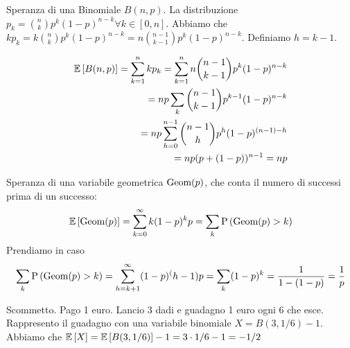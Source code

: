 \begin{defn}
    Speranza di una Binomiale $ B(n,p) $. La distribuzione $ p_k = \binom{n}{k}p^k(1-p)^{n-k}  \forall k \in [0,n] $. Abbiamo che $ kp_k = k \binom{n}{k}p^k (1-p)^{n-k} = n \binom{n-1}{k-1} p^k(1-p)^{n-k} $. Definiamo $ h = k-1 $.
    
    \begin{equation*}
        \begin{aligned}
            \mathbb{E}\left[B(n,p)\right] = \sum_{k=1}^{n} kp_k = \sum_{k=1}^{n} n \binom{n-1}{k-1} p^k(1-p)^{n-k} \\
            = np \sum_{k} \binom{n-1}{k-1}p^{k-1}(1-p)^{n-k} \\
            = np \sum_{h=0}^{n-1} \binom{n-1}{h} p^h(1-p)^{(n-1) - h } \\
            = np(p+(1-p))^{n-1} = np
        \end{aligned}
    \end{equation*}

\end{defn}

\begin{defn}
    Speranza di una variabile geometrica $ \text{Geom}(p) $, che conta il numero di successi prima di un successo:
    \begin{equation*}
    \mathbb{E}\left[\text{Geom}(p)\right] = \sum_{k=0}^{\infty} k(1-p)^k p = \sum_{k}\text{P}\left(\text{Geom}(p) > k\right)
    \end{equation*}
    Prendiamo in caso 
    \begin{equation*}
        \sum_{k}\text{P}\left(\text{Geom}(p) > k\right) = \sum_{h=k+1}^{\infty} (1-p)^(h-1)p = \sum_{k}(1-p)^k = \dfrac{1}{1-(1-p)} = \dfrac{1}{p}
    \end{equation*}
\end{defn}


\begin{exmp}
    Scommetto. Pago 1 euro. Lancio 3 dadi e guadagno 1 euro ogni 6 che esce.
    Rappresento il guadagno con una variabile binomiale $ X = B(3,1/6) - 1$. Abbiamo che $ \mathbb{E}\left[X\right] = \mathbb{E}\left[B(3,1/6)\right] - 1 = 3 \cdot 1/6 - 1 = -1/2$
\end{exmp}
        

